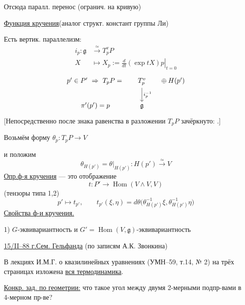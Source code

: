 Отсюда паралл. перенос (огранич. на кривую)

\underline{Функция кручения}\qquad (аналог структ. констант группы Ли)

Есть вертик. параллелизм:
\begin{equation*}
\begin{aligned}
i_p\colon\mathfrak g&\overset{\simeq}{\longrightarrow}T_p^vP\\
X&\mapsto X_p:=\left.\frac{d}{dt}(\exp tX)p\right|_{t=0}
\end{aligned}
\end{equation*}
\begin{equation*}
\begin{tikzcd}[column sep=small]
p'\in P'\ \Rightarrow\ T_pP={} & T_p^v \arrow[d,"i_p^{-1}"] & {}\oplus H(p') \\
\pi'(p')=p & \mathfrak g &
\end{tikzcd}
\end{equation*}
[Непосредственно после знака равенства в разложении $T_pP$ зачёркнуто:
.]

Возьмём форму $\theta_p\colon T_pP\to V$

и положим
\begin{equation*}
\theta_{H(p')}=\theta|_{H(p')}\colon H(p')\overset{\simeq}{\longrightarrow}V
\end{equation*}
\underline{Опр.}\quad \underline{ф-я кручения} — это отображение
\begin{equation*}
t\colon P'\longrightarrow\operatorname{Hom}(V\wedge V,V)
\end{equation*}
(тензоры типа 1,2)
\begin{equation*}
p'\mapsto t_{p'},\qquad
 t_{p'}(\xi,\eta)=d\theta\bigl(\theta_{H(p')}^{-1}\xi,\theta_{H(p')}^{-1}\eta\bigr)
\end{equation*}
\underline{Свойства ф-и кручения.}

1) $G$-эквивариантность и $G'=\operatorname{Hom}(V,\mathfrak g)$-эквивариантность


\underline{15/II--88 г.}\qquad \underline{Сем. Гельфанда}
(по записям А.К. Звонкина)

В лекциях И.М.Г. о квазилинейных уравнениях (УМН--59, т.14, № 2)
на трёх страницах изложена \underline{вся термодинамика}.

\underline{Конкр. зад. по геометрии:} что такое угол между двумя 2-мерными подпр-вами
в 4-мерном пр-ве?

